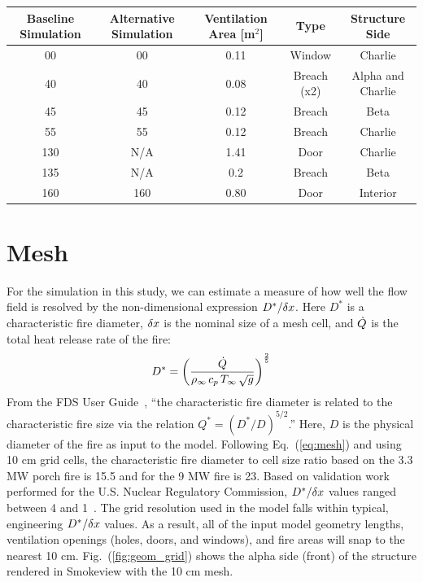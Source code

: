 \documentclass[11pt,oneside]{book}
\begin{document}
\begin{table}
\centering
{}\label{tab:vents}
\begin{tabular}{ccccc}
\toprule[1.5pt]
Baseline Simulation & Alternative Simulation & Ventilation Area [m$^2$] & Type & Structure Side \\
\midrule
00    &  00   & 0.11 & Window      & Charlie \\
40    &  40   & 0.08 & Breach (x2) & Alpha and Charlie \\
45    &  45   & 0.12 & Breach      & Beta \\
55    &  55   & 0.12 & Breach      & Charlie \\     
130   &  N/A  & 1.41 & Door        & Charlie \\
135   &  N/A  & 0.2  & Breach      & Beta \\        
160   &  160  & 0.80 & Door        & Interior \\
\bottomrule[1.25pt]
\end{tabular}\par
\end{table}

\section{Mesh}
\label{mesh}

For the simulation in this study, we can estimate a measure of how well the flow field is resolved by the non-dimensional expression $D^*/\delta x$. Here $D^*$ is a characteristic fire diameter, $\delta x$ is the nominal size of a mesh cell, and $\dot{Q}$ is the total heat release rate of the fire:
\begin{equation}
D^* = \left(
     \frac{\dot{Q}}{\rho_\infty \, c_p \, T_\infty \, \sqrt{g} }
     \right)^\frac{2}{5} 
\label{eq:mesh}
\end{equation}   
From the FDS User Guide~\cite{FDS_Users_Guide}, ``the characteristic fire diameter is related to the characteristic fire size via the
relation $Q^* = (D^*/D)^{5/2}$.'' Here, $D$ is the physical diameter of the fire as input to the model. Following Eq.~(\ref{eq:mesh}) and using 10 cm grid cells, the characteristic fire diameter to cell size ratio based on the 3.3 MW porch fire is 15.5 and for the 9 MW fire is 23. Based on validation work performed for the U.S. Nuclear Regulatory Commission, $D^*/\delta x$ values ranged between 4 and 1~\cite{NUREG_1824}. The grid resolution used in the model falls within typical, engineering $D^*/\delta x$ values. As a result, all of the input model geometry lengths, ventilation openings (holes, doors, and windows), and fire areas will snap to the nearest 10 cm. Fig.~(\ref{fig:geom_grid}) shows the 
alpha side (front) of the structure rendered in Smokeview with the 10 cm mesh.
\end{document}
